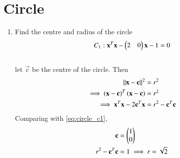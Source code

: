 \documentclass[journal,12pt,twocolumn]{IEEEtran}
\renewcommand\thesection{\arabic{section}}
\begin{document}
\section{Circle}
\begin{enumerate}[label=\thesection.\arabic*
,ref=\thesection.\theenumi]
\item Find the centre and radius of the circle
\begin{equation}
C_1: \mathbf{x}^T\mathbf{x} - \begin{pmatrix}2 & 0\end{pmatrix}\mathbf{x} 
-1 = 0 
\label{eq:circle_c1}
\end{equation}
%
\\
\solution let $\vec{c}$ be the centre of the circle.  Then
\begin{align}
\lVert\mathbf{x}-\mathbf{c}\rVert^2 &= r^2
\\
\implies \left(\mathbf{x}-\mathbf{c}\right)^T\left(\mathbf{x}-\mathbf{c}\right) &= r^2
\\
\implies \mathbf{x}^T\mathbf{x} - 2\mathbf{c}^T\mathbf{x} &= r^2-\mathbf{c}^T\mathbf{c}
\end{align}
%
Comparing with \eqref{eq:circle_c1},
\begin{align}
\mathbf{c} &= \begin{pmatrix}1 \\0\end{pmatrix}
\\
r^2-\mathbf{c}^T\mathbf{c} &= 1 \implies r = \sqrt{2}
\end{align}


\end{enumerate}
\end{document}
